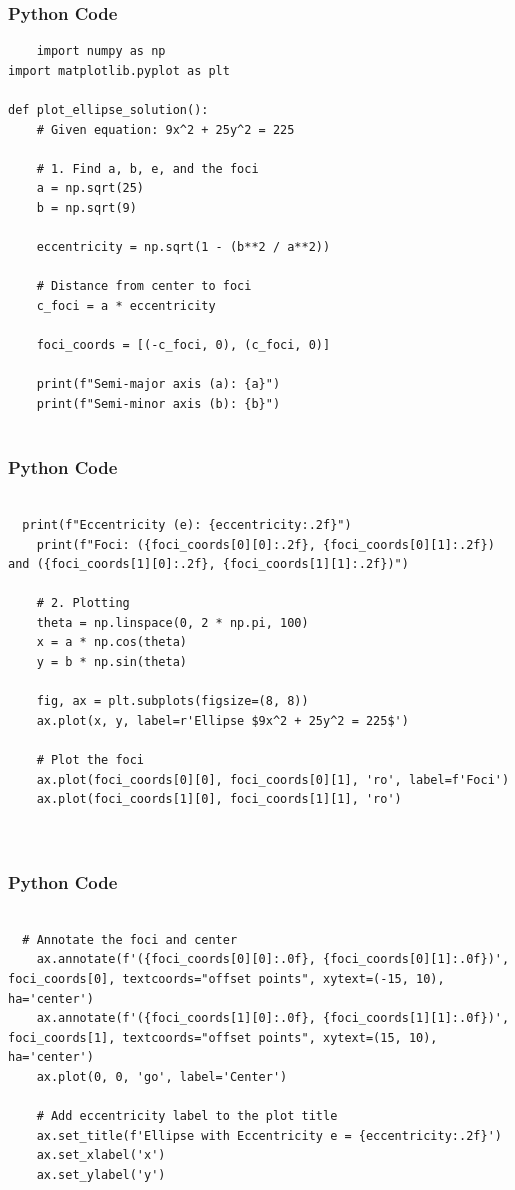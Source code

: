 \documentclass{beamer}
\begin{document}
\begin{frame}[fragile]
    \frametitle{Python Code }
    \begin{lstlisting}
    import numpy as np
import matplotlib.pyplot as plt

def plot_ellipse_solution():
    # Given equation: 9x^2 + 25y^2 = 225
    
    # 1. Find a, b, e, and the foci
    a = np.sqrt(25)
    b = np.sqrt(9)
    
    eccentricity = np.sqrt(1 - (b**2 / a**2))
    
    # Distance from center to foci
    c_foci = a * eccentricity
    
    foci_coords = [(-c_foci, 0), (c_foci, 0)]
    
    print(f"Semi-major axis (a): {a}")
    print(f"Semi-minor axis (b): {b}")
  
      \end{lstlisting}
\end{frame} 

\begin{frame}[fragile]
    \frametitle{Python Code }
    \begin{lstlisting}

  print(f"Eccentricity (e): {eccentricity:.2f}")
    print(f"Foci: ({foci_coords[0][0]:.2f}, {foci_coords[0][1]:.2f}) and ({foci_coords[1][0]:.2f}, {foci_coords[1][1]:.2f})")

    # 2. Plotting
    theta = np.linspace(0, 2 * np.pi, 100)
    x = a * np.cos(theta)
    y = b * np.sin(theta)

    fig, ax = plt.subplots(figsize=(8, 8))
    ax.plot(x, y, label=r'Ellipse $9x^2 + 25y^2 = 225$')
    
    # Plot the foci
    ax.plot(foci_coords[0][0], foci_coords[0][1], 'ro', label=f'Foci')
    ax.plot(foci_coords[1][0], foci_coords[1][1], 'ro')
    
  
      \end{lstlisting}
\end{frame} 

\begin{frame}[fragile]
    \frametitle{Python Code }
    \begin{lstlisting}

  # Annotate the foci and center
    ax.annotate(f'({foci_coords[0][0]:.0f}, {foci_coords[0][1]:.0f})', foci_coords[0], textcoords="offset points", xytext=(-15, 10), ha='center')
    ax.annotate(f'({foci_coords[1][0]:.0f}, {foci_coords[1][1]:.0f})', foci_coords[1], textcoords="offset points", xytext=(15, 10), ha='center')
    ax.plot(0, 0, 'go', label='Center')
    
    # Add eccentricity label to the plot title
    ax.set_title(f'Ellipse with Eccentricity e = {eccentricity:.2f}')
    ax.set_xlabel('x')
    ax.set_ylabel('y')
   
    
    
      \end{lstlisting}
\end{frame} 
\end{document}
